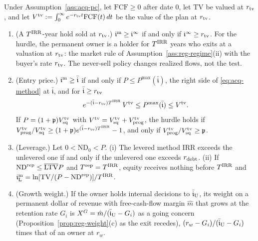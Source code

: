\begin{proposition}\label{prop:acq-pc}
Under Assumption~\ref{ass:acq-pc}, let $\mathrm{FCF}\ge0$ after date 0, let $\mathrm{TV}$ be valued at $r_{\rm tv}$, and let $V^{\rm tv}:=\int_0^\infty e^{-r_{\rm tv}t}\mathrm{FCF}(t)\,dt$ be the value of the plan at $r_{\rm tv}$.
\begin{enumerate}
\item[(a)] (A $T^{\rm IRR}$-year hold sold at $r_{\rm tv}$.) $\mathfrak i^{\rm m}\ge\mathfrak i^\infty$ if and only if $\mathfrak i^\infty\ge r_{\rm tv}$. For the hurdle, the permanent owner is a holder for $T^{\rm IRR}$ years who exits at a valuation at $r_{\rm tv}$: the market rule of Assumption~\ref{ass:reg-regime}(ii) with the buyer's rate $r_{\rm tv}$. The never-sell policy changes realized flows, not the test.
\item[(b)] (Entry price.) $\mathfrak i^{\rm m}\ge\bar{\mathfrak i}$ if and only if $P\le P^{\max}(\bar{\mathfrak i})$, the right side of \eqref{eq:acq-method} at $\bar{\mathfrak i}$, and for $\bar{\mathfrak i}\ge r_{\rm tv}$
\begin{equation}\label{eq:acq-pmaxbound}
e^{-(\bar{\mathfrak i}-r_{\rm tv})T^{\rm IRR}}\,V^{\rm tv}\le P^{\max}(\bar{\mathfrak i})\le V^{\rm tv}.
\end{equation}
If $P=(1+\mathfrak p)V^{\rm tv}_{\rm sq}$ with $V^{\rm tv}=V^{\rm tv}_{\rm sq}+V^{\rm tv}_{\rm prog}$, the hurdle holds if $V^{\rm tv}_{\rm prog}/V^{\rm tv}_{\rm sq}\ge(1+\mathfrak p)e^{(\bar{\mathfrak i}-r_{\rm tv})T^{\rm IRR}}-1$, and only if $V^{\rm tv}_{\rm prog}/V^{\rm tv}_{\rm sq}\ge\mathfrak p$.
\item[(c)] (Leverage.) Let $0<\mathrm{ND}_0<P$. (i) The levered method IRR exceeds the unlevered one if and only if the unlevered one exceeds $r_{\rm debt}$. (ii) If $\mathrm{ND}^{\rm rep}\le\overline{\mathrm{LTV}}P$ and $T^{\rm rep}=T^{\rm IRR}$, equity receives nothing before $T^{\rm IRR}$ and $\mathfrak i^{\rm m}_{\rm L}=\ln[\mathrm{TV}/(P-\mathrm{ND}^{\rm rep})]/T^{\rm IRR}$.
\item[(d)] (Growth weight.) If the owner holds internal decisions to $\bar{\mathfrak i}_{\rm U}$, its weight on a permanent dollar of revenue with free-cash-flow margin $\hat m$ that grows at the retention rate $G_i$ is $X^{G}=\hat m/(\bar{\mathfrak i}_{\rm U}-G_i)$ as a going concern (Proposition~\ref{prop:reg-weight}(c) as the exit recedes), $(r_w-G_i)/(\bar{\mathfrak i}_{\rm U}-G_i)$ times that of an owner at $r_w$.
\end{enumerate}
\end{proposition}

